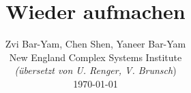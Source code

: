 \documentclass[onecolumn,journal]{IEEEtran}
\begin{document}
\title{\color{Brown} Wieder aufmachen \\
\vspace{-0.35ex}}
\author{\large Zvi Bar-Yam, Chen Shen, Yaneer Bar-Yam \\ New England Complex Systems Institute \\
\vspace{+0.35ex}
\small{\textit{(übersetzt von U. Renger, V. Brunsch})}\\
 \today 
  \vspace{-10ex} \\ 

   
\bigskip
\bigskip

\textbf{}
 }
    
\maketitle


\flushbottom %



\thispagestyle{empty} %




\renewcommand{\thefootnote}{\fnsymbol{footnote}}
\end{document}
